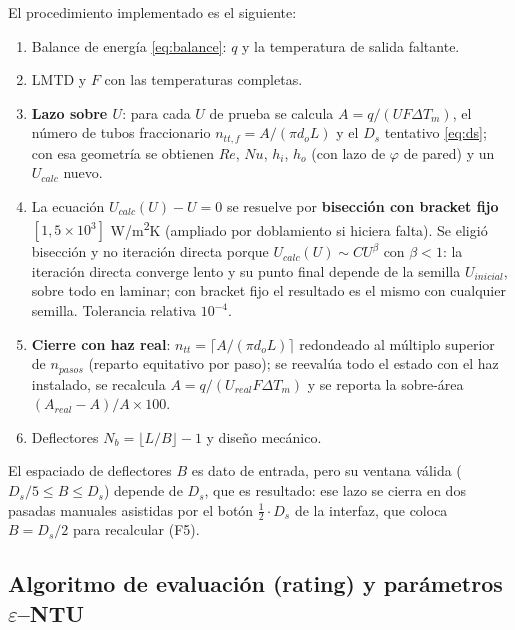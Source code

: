 \documentclass[11pt,a4paper]{article}
\begin{document}
El procedimiento implementado es el siguiente:
\begin{enumerate}[leftmargin=1.6em]
\item Balance de energ\'ia \eqref{eq:balance}: $q$ y la temperatura de salida
faltante.
\item LMTD y $F$ con las temperaturas completas.
\item \textbf{Lazo sobre $U$}: para cada $U$ de prueba se calcula
$A = q/(U F \Delta T_m)$, el n\'umero de tubos fraccionario $n_{tt,f} =
A/(\pi d_o L)$ y el $D_s$ tentativo \eqref{eq:ds}; con esa geometr\'ia se
obtienen $Re$, $Nu$, $h_i$, $h_o$ (con lazo de $\varphi$ de pared) y un
$U_{calc}$ nuevo.
\item La ecuaci\'on $U_{calc}(U) - U = 0$ se resuelve por \textbf{bisecci\'on
con bracket fijo} $[1, 5\times 10^3]$ W/m\textsuperscript{2}K (ampliado por
doblamiento si hiciera falta). Se eligi\'o bisecci\'on y no iteraci\'on directa
porque $U_{calc}(U) \sim C U^{\beta}$ con $\beta < 1$: la iteraci\'on directa
converge lento y su punto final depende de la semilla $U_{inicial}$, sobre todo
en laminar; con bracket fijo el resultado es el mismo con cualquier semilla.
Tolerancia relativa $10^{-4}$.
\item \textbf{Cierre con haz real}: $n_{tt} = \lceil A/(\pi d_o L)\rceil$
redondeado al m\'ultiplo superior de $n_{pasos}$ (reparto equitativo por paso);
se reeval\'ua todo el estado con el haz instalado, se recalcula
$A = q/(U_{real} F \Delta T_m)$ y se reporta la sobre-\'area
$(A_{real} - A)/A \times 100$.
\item Deflectores $N_b = \lfloor L/B \rfloor - 1$ y dise\~no mec\'anico.
\end{enumerate}

El espaciado de deflectores $B$ es dato de entrada, pero su ventana v\'alida
($D_s/5 \le B \le D_s$) depende de $D_s$, que es resultado: ese lazo se cierra
en dos pasadas manuales asistidas por el bot\'on
\textbf{$\frac{1}{2}\cdot D_s$} de la
interfaz, que coloca $B = D_s/2$ para recalcular (F5).

\subsection{Algoritmo de evaluaci\'on (rating) y par\'ametros $\varepsilon$--NTU}
\end{document}
